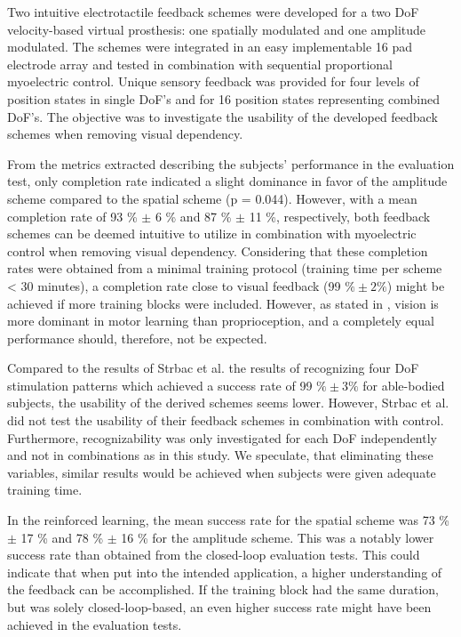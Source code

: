 Two intuitive electrotactile feedback schemes were developed for a two DoF velocity-based virtual prosthesis: one spatially modulated and one amplitude modulated. The schemes were integrated in an easy implementable 16 pad electrode array and tested in combination with sequential proportional myoelectric control. Unique sensory feedback was provided for four levels of position states in single DoF's and for 16 position states representing combined DoF's. The objective was to investigate the usability of the developed feedback schemes when removing visual dependency.

From the metrics extracted describing the subjects' performance in the evaluation test, only completion rate indicated a slight  dominance in favor of the amplitude scheme compared to the spatial scheme (p = 0.044). However, with a mean completion rate of 93 \% $\pm$ 6 \% and 87 \% $\pm$ 11 \%, respectively, both feedback schemes can be deemed intuitive to utilize in combination with myoelectric control when removing visual dependency. Considering that these completion rates were obtained from a minimal training protocol (training time per scheme < 30 minutes), a completion rate close to visual feedback (99 $\% \pm 2\%$) might be achieved if more training blocks were included. However, as stated in \cite{Adams1977}, vision is more dominant in motor learning than proprioception, and a completely equal performance should, therefore, not be expected.

Compared to the results of Strbac et al. \cite{Strbac2016} the results of recognizing four DoF stimulation patterns which achieved a success rate of 99 $\% \pm 3\%$ for able-bodied subjects, the usability of the derived schemes seems lower. However, Strbac et al. did not test the usability of their feedback schemes in combination with control. Furthermore, recognizability was only investigated for each DoF independently and not in combinations as in this study. We speculate, that eliminating these variables, similar results would be achieved when subjects were given adequate training time.       

In the reinforced learning, the mean success rate for the spatial scheme was 73 \%  $\pm$ 17 \% and 78 \%  $\pm$ 16 \% for the amplitude scheme. This was a notably lower success rate than obtained from the closed-loop evaluation tests. This could indicate that when put into the intended application, a higher understanding of the feedback can be accomplished. If the training block had the same duration, but was solely closed-loop-based, an even higher success rate might have been achieved in the evaluation tests. 

